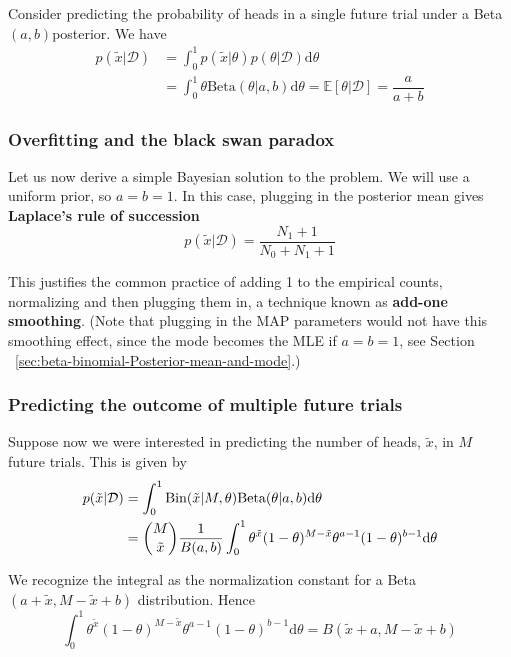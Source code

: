 Consider predicting the probability of heads in a single future trial under a Beta$(a, b)$posterior. We have
\begin{align}
p(\tilde{x}|\mathcal{D})& =\int_0^1 p(\tilde{x}|\theta)p(\theta|\mathcal{D})\mathrm{d}\theta \\
                        & =\int_0^1 \theta\text{Beta}(\theta|a,b)\mathrm{d}\theta=\mathbb{E}[\theta|\mathcal{D}]=\dfrac{a}{a+b}
\end{align}

\subsubsection{Overfitting and the black swan paradox}
Let us now derive a simple Bayesian solution to the problem. We will use a uniform prior, so $a=b=1$. In this case, plugging in the posterior mean gives \textbf{Laplace’s rule of succession}
\begin{equation}
p(\tilde{x}|\mathcal{D})=\dfrac{N_1+1}{N_0+N_1+1}
\end{equation}

This justifies the common practice of adding 1 to the empirical counts, normalizing and then plugging them in, a technique known as \textbf{add-one smoothing}. (Note that plugging in the MAP parameters would not have this smoothing effect, since the mode becomes the MLE if $a=b=1$, see Section ~\ref{sec:beta-binomial-Posterior-mean-and-mode}.)

\subsubsection{Predicting the outcome of multiple future trials}
Suppose now we were interested in predicting the number of heads, $\tilde{x}$, in $M$ future trials. This is given by
\begin{align}
p(\tilde{x}|\mathcal{D})& =\int_0^1 \text{Bin}(\tilde{x}|M,\theta)\text{Beta}(\theta|a,b)\mathrm{d}\theta \\
                        & =\dbinom{M}{\tilde{x}}\dfrac{1}{B(a,b)}\int_0^1 \theta^{\tilde{x}}(1-\theta)^{M-\tilde{x}}\theta^{a-1}(1-\theta)^{b-1}\mathrm{d}\theta
\end{align}

We recognize the integral as the normalization constant for a Beta$(a+\tilde{x}, M−\tilde{x}+b)$ distribution. Hence
\begin{equation}
\int_0^1 \theta^{\tilde{x}}(1-\theta)^{M-\tilde{x}}\theta^{a-1}(1-\theta)^{b-1}\mathrm{d}\theta=B(\tilde{x}+a,M-\tilde{x}+b)
\end{equation}


